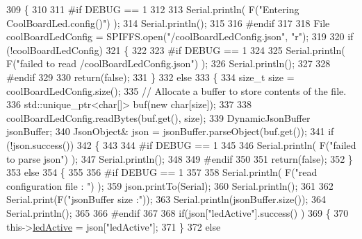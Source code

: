 \begin{DoxyCode}
309 \{
310 
311 \textcolor{preprocessor}{#if DEBUG == 1 }
312         
313     Serial.println( F(\textcolor{stringliteral}{"Entering CoolBoardLed.config()"}) );
314     Serial.println();
315 
316 \textcolor{preprocessor}{#endif}
317     
318     File coolBoardLedConfig = SPIFFS.open(\textcolor{stringliteral}{"/coolBoardLedConfig.json"}, \textcolor{stringliteral}{"r"});
319 
320     \textcolor{keywordflow}{if} (!coolBoardLedConfig) 
321     \{
322     
323 \textcolor{preprocessor}{    #if DEBUG == 1}
324 
325         Serial.println( F(\textcolor{stringliteral}{"failed to read /coolBoardLedConfig.json"}) );
326         Serial.println();
327 
328 \textcolor{preprocessor}{    #endif}
329 
330         \textcolor{keywordflow}{return}(\textcolor{keyword}{false});
331     \}
332     \textcolor{keywordflow}{else}
333     \{
334         \textcolor{keywordtype}{size\_t} size = coolBoardLedConfig.size();
335         \textcolor{comment}{// Allocate a buffer to store contents of the file.}
336         std::unique\_ptr<char[]> buf(\textcolor{keyword}{new} \textcolor{keywordtype}{char}[size]);
337 
338         coolBoardLedConfig.readBytes(buf.get(), size);
339         DynamicJsonBuffer jsonBuffer;
340         JsonObject& json = jsonBuffer.parseObject(buf.get());
341         \textcolor{keywordflow}{if} (!json.success()) 
342         \{
343         
344 \textcolor{preprocessor}{        #if DEBUG == 1}
345 
346             Serial.println( F(\textcolor{stringliteral}{"failed to parse json"}) );
347             Serial.println();
348         
349 \textcolor{preprocessor}{        #endif}
350 
351             \textcolor{keywordflow}{return}(\textcolor{keyword}{false});
352         \} 
353         \textcolor{keywordflow}{else}
354         \{
355         
356 \textcolor{preprocessor}{        #if DEBUG == 1}
357     
358             Serial.println( F(\textcolor{stringliteral}{"read configuration file : "}) );
359             json.printTo(Serial);
360             Serial.println();
361             
362             Serial.print(F(\textcolor{stringliteral}{"jsonBuffer size :"}));
363             Serial.println(jsonBuffer.size());
364             Serial.println();
365 
366 \textcolor{preprocessor}{        #endif}
367   
368             \textcolor{keywordflow}{if}(json[\textcolor{stringliteral}{"ledActive"}].success() )
369             \{
370                 this->\hyperlink{class_cool_board_led_aadd04d2ecf123247718d77f42fba7f08}{ledActive} = json[\textcolor{stringliteral}{"ledActive"}]; 
371             \}
372             \textcolor{keywordflow}{else}

\end{DoxyCode}
